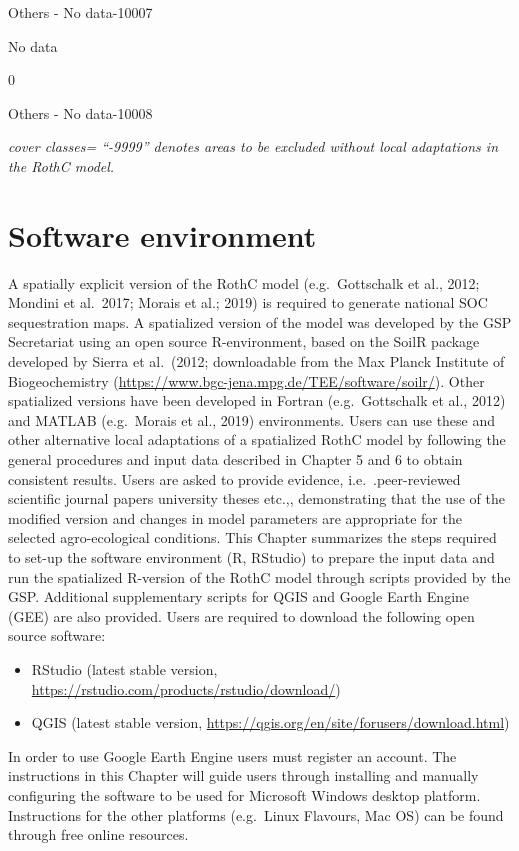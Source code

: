 \documentclass[
  10pt,
  b5paper,
]{book}
\providecommand{\tightlist}{%
  \setlength{\itemsep}{0pt}\setlength{\parskip}{0pt}}
\begin{document}
Others - No data-10007

No data

0

Others - No data-10008

\emph{cover classes= ``-9999'' denotes areas to be excluded without local adaptations in the RothC model.}

\hypertarget{software-environment}{%
\chapter{\textbar{} Software environment}\label{software-environment}}

A spatially explicit version of the RothC model (e.g.~Gottschalk et al., 2012; Mondini et al.~2017; Morais et al.; 2019) is required to generate national SOC sequestration maps. A spatialized version of the model was developed by the GSP Secretariat using an open source R-environment, based on the SoilR package developed by Sierra et al.~(2012; downloadable from the Max Planck Institute of Biogeochemistry (\url{https://www.bgc-jena.mpg.de/TEE/software/soilr/}).
Other spatialized versions have been developed in Fortran (e.g.~Gottschalk et al., 2012) and MATLAB (e.g.~Morais et al., 2019) environments. Users can use these and other alternative local adaptations of a spatialized RothC model by following the general procedures and input data described in Chapter 5 and 6 to obtain consistent results. Users are asked to provide evidence, i.e.~.peer-reviewed scientific journal papers university theses etc.,, demonstrating that the use of the modified version and changes in model parameters are appropriate for the selected agro-ecological conditions.
This Chapter summarizes the steps required to set-up the software environment (R, RStudio) to prepare the input data and run the spatialized R-version of the RothC model through scripts provided by the GSP. Additional supplementary scripts for QGIS and Google Earth Engine (GEE) are also provided.
Users are required to download the following open source software:

\begin{itemize}
\tightlist
\item
  RStudio (latest stable version, \url{https://rstudio.com/products/rstudio/download/})
\item
  QGIS (latest stable version, \url{https://qgis.org/en/site/forusers/download.html})
\end{itemize}

In order to use Google Earth Engine users must register an account. The instructions in this Chapter will guide users through installing and manually configuring the software to be used for Microsoft Windows desktop platform. Instructions for the other platforms (e.g.~Linux Flavours, Mac OS) can be found through free online resources.
\end{document}
